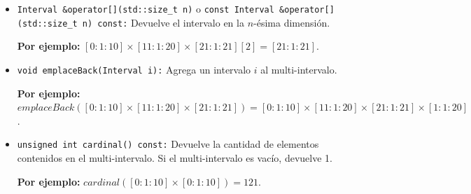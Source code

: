 \begin{itemize}

    \item \texttt{Interval \&operator[](std::size\_t n)} o \texttt{const Interval \&operator[](std::size\_t n) const:}  
    Devuelve el intervalo en la $n$-ésima dimensión.

    \begin{center}
        \textbf{Por ejemplo:} $[0: 1: 10] \times [11: 1: 20]  \times [21: 1: 21][2]=[21: 1: 21]$.
    \end{center}
    

     \item \texttt{void emplaceBack(Interval i):}
     Agrega un intervalo $i$ al multi-intervalo.

     \begin{center}
        \textbf{Por ejemplo:} $emplaceBack([0: 1: 10] \times [11: 1: 20] \times[21: 1: 21]) = [0: 1: 10] \times [11: 1: 20] \times [21: 1: 21] \times [1: 1: 20]$.
    \end{center}

    \item \texttt{unsigned int cardinal() const:}  
    Devuelve la cantidad de elementos contenidos en el multi-intervalo. Si el multi-intervalo es vacío, devuelve 1.

    \begin{center}
    \textbf{Por ejemplo:} $cardinal([0:1:10] \times [0:1:10])=121$.
    \end{center}


\end{itemize}
